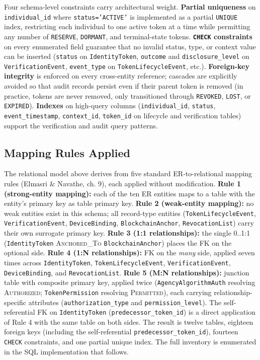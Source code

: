 \documentclass[11pt,letterpaper]{article}
\newcommand{\entity}[1]{\texttt{\color{navydark}#1}}
\begin{document}
Four schema-level constraints carry architectural weight. \textbf{Partial uniqueness} on \texttt{individual\_id} where \texttt{status='ACTIVE'} is implemented as a partial \texttt{UNIQUE} index, restricting each individual to one active token at a time while permitting any number of \texttt{RESERVE}, \texttt{DORMANT}, and terminal-state tokens. \textbf{\texttt{CHECK} constraints} on every enumerated field guarantee that no invalid status, type, or context value can be inserted (\texttt{status} on \entity{IdentityToken}, \texttt{outcome} and \texttt{disclosure\_level} on \entity{VerificationEvent}, \texttt{event\_type} on \entity{TokenLifecycleEvent}, etc.). \textbf{Foreign-key integrity} is enforced on every cross-entity reference; cascades are explicitly avoided so that audit records persist even if their parent token is removed (in practice, tokens are never removed, only transitioned through \texttt{REVOKED}, \texttt{LOST}, or \texttt{EXPIRED}). \textbf{Indexes} on high-query columns (\texttt{individual\_id}, \texttt{status}, \texttt{event\_timestamp}, \texttt{context\_id}, \texttt{token\_id} on lifecycle and verification tables) support the verification and audit query patterns.

\subsection{Mapping Rules Applied}

The relational model above derives from five standard ER-to-relational mapping rules (Elmasri \& Navathe, ch. 9), each applied without modification. \textbf{Rule 1 (strong-entity mapping):} each of the ten ER entities maps to a table with the entity's primary key as table primary key. \textbf{Rule 2 (weak-entity mapping):} no weak entities exist in this schema; all record-type entities (\entity{TokenLifecycleEvent}, \entity{VerificationEvent}, \entity{DeviceBinding}, \entity{BlockchainAnchor}, \entity{RevocationList}) carry their own surrogate primary key. \textbf{Rule 3 (1:1 relationships):} the single 0..1:1 (\entity{IdentityToken} \textsc{Anchored\_To} \entity{BlockchainAnchor}) places the FK on the optional side. \textbf{Rule 4 (1:N relationships):} FK on the \textit{many} side, applied seven times across \entity{IdentityToken}, \entity{TokenLifecycleEvent}, \entity{VerificationEvent}, \entity{DeviceBinding}, and \entity{RevocationList}. \textbf{Rule 5 (M:N relationships):} junction table with composite primary key, applied twice (\entity{AgencyAlgorithmAuth} resolving \textsc{Authorized}; \entity{TokenPermission} resolving \textsc{Permitted}), each carrying relationship-specific attributes (\texttt{authorization\_type} and \texttt{permission\_level}). The self-referential FK on \entity{IdentityToken} (\texttt{predecessor\_token\_id}) is a direct application of Rule 4 with the same table on both sides. The result is twelve tables, eighteen foreign keys (including the self-referential \texttt{predecessor\_token\_id}), fourteen \texttt{CHECK} constraints, and one partial unique index. The full inventory is enumerated in the SQL implementation that follows.
\end{document}
